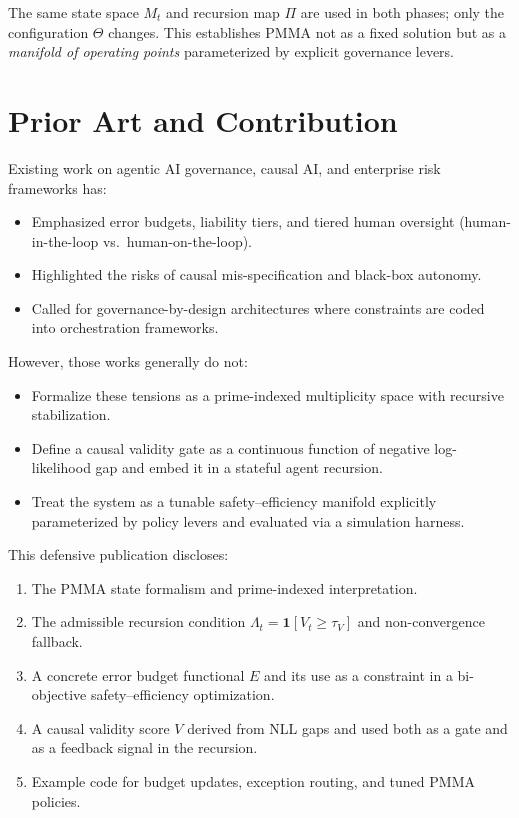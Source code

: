 \documentclass[11pt]{article}
\begin{document}
The same state space $M_t$ and recursion map $\Pi$ are used in both phases; only the configuration $\Theta$ changes.
This establishes PMMA not as a fixed solution but as a \emph{manifold of operating points} parameterized by explicit governance levers.

\section{Prior Art and Contribution}

Existing work on agentic AI governance, causal AI, and enterprise risk frameworks has:
\begin{itemize}
  \item Emphasized error budgets, liability tiers, and tiered human oversight (human-in-the-loop vs.\ human-on-the-loop).
  \item Highlighted the risks of causal mis-specification and black-box autonomy.
  \item Called for governance-by-design architectures where constraints are coded into orchestration frameworks.
\end{itemize}

However, those works generally do not:
\begin{itemize}
  \item Formalize these tensions as a prime-indexed multiplicity space with recursive stabilization.
  \item Define a causal validity gate as a continuous function of negative log-likelihood gap and embed it in a stateful agent recursion.
  \item Treat the system as a tunable safety--efficiency manifold explicitly parameterized by policy levers and evaluated via a simulation harness.
\end{itemize}

This defensive publication discloses:
\begin{enumerate}
  \item The PMMA state formalism and prime-indexed interpretation.
  \item The admissible recursion condition $\Lambda_t = \mathbf{1}[V_t \ge \tau_V]$ and non-convergence fallback.
  \item A concrete error budget functional $E$ and its use as a constraint in a bi-objective safety--efficiency optimization.
  \item A causal validity score $V$ derived from NLL gaps and used both as a gate and as a feedback signal in the recursion.
  \item Example code for budget updates, exception routing, and tuned PMMA policies.
\end{enumerate}
\end{document}
